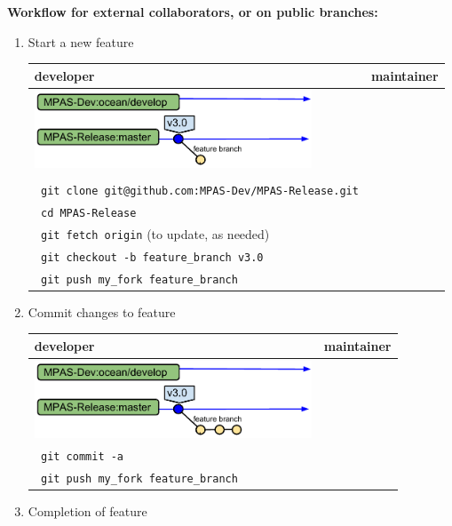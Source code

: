 \documentclass[11pt]{article}
\begin{document}
\clearpage

{\bf Workflow for external collaborators, or on public branches:}

\begin{enumerate}
\item Start a new feature

 \begin{tabular}[c]{L{3.3in}|L{3.3in}}
developer & maintainer \\
\hline
\includegraphics[width=3.25in]{f/MPASworkflow_ext1.pdf} \\
\\
\verb| git clone git@github.com:MPAS-Dev/MPAS-Release.git|\\
\verb| cd MPAS-Release|\\
\verb| git fetch origin| (to update, as needed)\\
\verb| git checkout -b feature_branch v3.0 | \\
\verb| git push my_fork feature_branch|  & 
 \end{tabular}

\item Commit changes to feature 

 \begin{tabular}[c]{L{3.3in}|L{3.3in}}
developer & maintainer \\
\hline
\includegraphics[width=3.25in]{f/MPASworkflow_ext2.pdf} \\
\verb| git commit -a|  \\
\verb| git push my_fork feature_branch|  
 \end{tabular}

\item Completion of feature


\end{enumerate}
\end{document}
